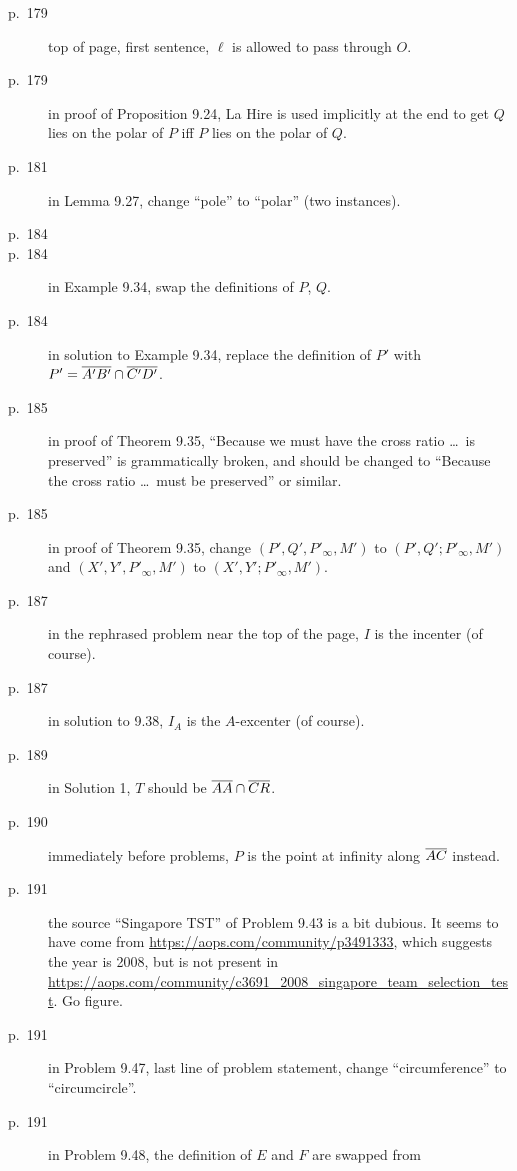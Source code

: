 \documentclass[11pt]{scrartcl}
\begin{document}
\begin{description}
\item[p.\  179] top of page, first sentence, $\ell$ is allowed to pass through $O$.
\item[p.\  179] in proof of Proposition 9.24, La Hire is used implicitly at the end
  to get $Q$ lies on the polar of $P$ iff $P$ lies on the polar of $Q$.
\item[p.\  181] in Lemma 9.27, change ``pole'' to ``polar'' (two instances).
\item[p.\  184] 
\item[p.\  184] in Example 9.34, swap the definitions of $P$, $Q$.
\item[p.\  184] in solution to Example 9.34,
  replace the definition of $P'$ with $P' = \overline{A'B'} \cap \overline{C'D'}$.
\item[p.\  185] in proof of Theorem 9.35,
  ``Because we must have the cross ratio \dots\ is preserved''
  is grammatically broken, and should be changed to
  ``Because the cross ratio \dots\ must be preserved'' or similar.
\item[p.\  185] in proof of Theorem 9.35, change
  $(P', Q', P'_\infty, M')$ to $(P', Q'; P'_\infty, M')$
  and $(X', Y', P'_\infty, M')$ to $(X', Y'; P'_\infty, M')$.
\item[p.\  187] in the rephrased problem near the top of the page, $I$ is the incenter (of course).
\item[p.\  187] in solution to 9.38, $I_A$ is the $A$-excenter (of course).
\item[p.\  189] in Solution 1, $T$ should be $\overline{AA} \cap \overline{CR}$.
\item[p.\  190] immediately before problems, $P$ is the point at infinity along $\overline{AC}$ instead.
\item[p.\  191] the source ``Singapore TST'' of Problem 9.43 is a bit dubious.
  It seems to have come from \url{https://aops.com/community/p3491333},
  which suggests the year is 2008,
  but is not present in \url{https://aops.com/community/c3691_2008_singapore_team_selection_test}.
  Go figure.
\item[p.\  191] in Problem 9.47, last line of problem statement,
  change ``circumference'' to ``circumcircle''.
\item[p.\  191] in Problem 9.48, the definition of $E$ and $F$ are swapped from

\end{description}
\end{document}
